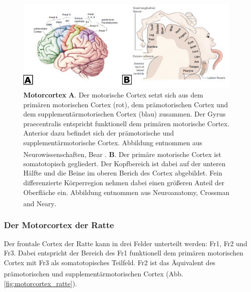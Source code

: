 \documentclass[12pt,a4paper,pdftex]{article}
\begin{document}
\begin{figure}[H]
    \centering
    \includegraphics[width=\textwidth]{pictures/Bilder_Laura/Motorcortex_2.png}
    \caption[Motorcortex]{\textbf{Motorcortex} \textbf{A}. Der motorische Cortex setzt sich aus dem primären motorischen Cortex (rot), dem prämotorischen Cortex und dem supplementärmotorischen Cortex (blau) zusammen. Der Gyrus praecentralis entspricht funktionell dem primären motorische Cortex. Anterior dazu befindet sich der prämotorische und supplementärmotorische Cortex. Abbildung entnommen aus Neurowissenschaften, Bear \textsuperscript{\cite[14]{neurowissenschaften_baer}}. \textbf{B}. Der primäre motorische Cortex ist somatotopisch gegliedert. Der Kopfbereich ist dabei auf der unteren Hälfte und die Beine im oberen Berich des Cortex abgebildet. Fein differenzierte Körperregion nehmen dabei einen größeren Anteil der Oberfläche ein. Abbildung entnommen aus Neuroanatomy, Crossman and Neary\textsuperscript{\cite[8]{crossman2014neuroanatomy}}.}
    \label{fig:motorkortex}
\end{figure}

\subsubsection*{Der Motorcortex der Ratte}
Der frontale Cortex der Ratte kann in drei Felder unterteilt werden: Fr1, Fr2 und Fr3. 
Dabei entspricht der Bereich des Fr1 funktionell dem primären motorischen Cortex mit Fr3 als somatotopisches Teilfeld. Fr2 ist das Äquivalent des prämotorischen und supplementärmotorischen Cortex \textsuperscript{\cite[22]{paxinos2014rat}}(Abb. \ref{fig:motorcortex_ratte}).  
\end{document}
